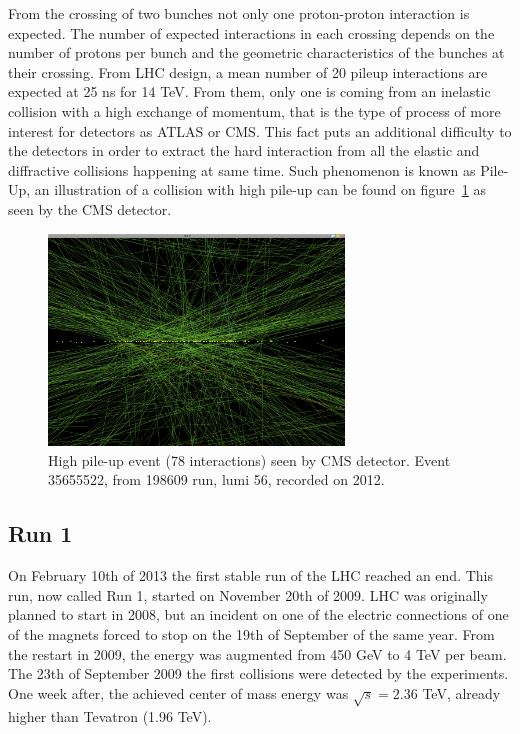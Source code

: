 From the crossing of two bunches not only one proton-proton interaction is expected. The number of expected interactions in each crossing depends on the number of protons per bunch and the geometric characteristics of the bunches at their crossing. From LHC design, a mean number of 20 pileup interactions are expected at 25 ns for 14 TeV. From them, only one is coming from an inelastic collision with a high exchange of momentum, that is the type of process of more interest for detectors as ATLAS or CMS. This fact puts an additional difficulty to the detectors in order to extract the hard interaction from all the elastic and diffractive collisions happening at same time. Such phenomenon is known as Pile-Up, an illustration of a collision with high pile-up can be found on figure~\ref{fig:pileup} as seen by the CMS detector.

\begin{figure}[!Hhtbp]
  \begin{center}
    \includegraphics[width=0.7\textwidth]{figs/pileup.png}
    \caption{High pile-up event (78 interactions) seen by CMS detector. Event 35655522, from 198609 run, lumi 56, recorded on 2012.}%
    \label{fig:pileup}
  \end{center}
\end{figure}

\subsection{Run 1}
\label{sec:run1}

On February 10th of 2013 the first stable run of the LHC reached an end. This run, now called Run 1, started on November 20th of 2009. LHC was originally planned to start in 2008, but an incident on one of the electric connections of one of the magnets forced to stop on the 19th of September of the same year. From the restart in 2009, the energy was augmented from 450 GeV to 4 TeV per beam. The 23th of September 2009 the first collisions were detected by the experiments. One week after, the achieved center of mass energy was $\sqrt{s}=2.36$ TeV, already higher than Tevatron (1.96 TeV).

